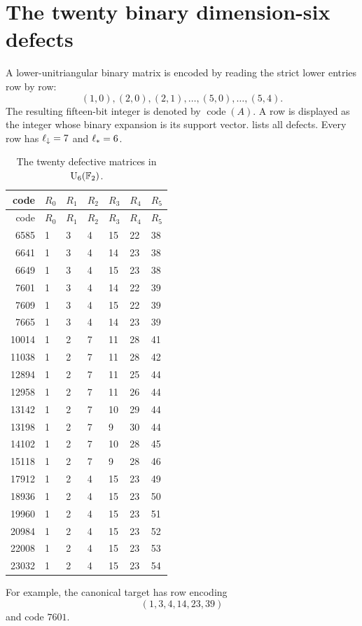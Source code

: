 \section{The twenty binary dimension-six defects}\label{app:twenty}

A lower-unitriangular binary matrix is encoded by reading the strict lower entries row by row:
\[
(1,0),
(2,0),(2,1),
\ldots,
(5,0),\ldots,(5,4).
\]
The resulting fifteen-bit integer is denoted by $\operatorname{code}(A)$.  A row is displayed as the integer whose binary expansion is its support vector.   lists all defects.  Every row has $\ell_{\downarrow}=7$ and $\ell_{*}=6$.

\begin{longtable}{@{}rllllll@{}}
\caption{The twenty defective matrices in $\operatorname{U}_6(\mathbb F_2)$.}\label{tab:twenty}\\
\toprule
code&$R_0$&$R_1$&$R_2$&$R_3$&$R_4$&$R_5$\\
\midrule
\endfirsthead
\toprule
code&$R_0$&$R_1$&$R_2$&$R_3$&$R_4$&$R_5$\\
\midrule
\endhead
6585&1&3&4&15&22&38\\
6641&1&3&4&14&23&38\\
6649&1&3&4&15&23&38\\
7601&1&3&4&14&22&39\\
7609&1&3&4&15&22&39\\
7665&1&3&4&14&23&39\\
10014&1&2&7&11&28&41\\
11038&1&2&7&11&28&42\\
12894&1&2&7&11&25&44\\
12958&1&2&7&11&26&44\\
13142&1&2&7&10&29&44\\
13198&1&2&7&9&30&44\\
14102&1&2&7&10&28&45\\
15118&1&2&7&9&28&46\\
17912&1&2&4&15&23&49\\
18936&1&2&4&15&23&50\\
19960&1&2&4&15&23&51\\
20984&1&2&4&15&23&52\\
22008&1&2&4&15&23&53\\
23032&1&2&4&15&23&54\\
\bottomrule
\end{longtable}

For example, the canonical target has row encoding
\[
(1,3,4,14,23,39)
\]
and code $7601$.

